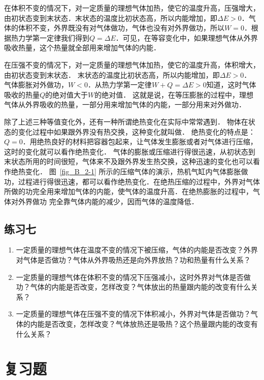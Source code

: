 在体积不变的情况下，对一定质量的理想气体加热，使它的温度升高，压强增大，由初状态变到末状态．末状态的温度比初状态高，所以内能增加，即$\Delta E>0$．气体的体积不变，外界既没有对气体做功，气体也没有对外界做功，所以$W=0$．根据热力学第一定律我们得到$Q=\Delta E$．可见，在等容变化中，如果理想气体从外界吸收热量，这个热量就全部用来增加气体的内能．

在压强不变的情况下，对一定质量的理想气体加热，使它的温度升高，体积增大，由初状态变到末状态．
末状态的温度比初状态高，所以内能增加，即$\Delta E>0$．
气体膨胀对外做功，$W<0$．从热力学第一定律$W+Q=\Delta E>0$知道，这时气体吸收的热量$Q$的绝对值大于$W$的绝对值．
这就是说，在等压膨胀的过程中，理想气体从外界吸收的热量，一部分用来增加气体的内能，一部分用来对外做功．

除了上述三种等值变化外，还有一种所谓绝热变化在实际中常常遇到．
物体在状态的变化过程中如果跟外界没有热交换，这种变化就叫做．
绝热变化的特点是：$Q=0$．用绝热良好的材料把容器包起来，让气体发生膨胀或者对气体进行压缩，这时的变化就可以看作绝热变化．
气体的膨胀或压缩进行得很迅速，从初状态到末状态所用的时间很短，气体来不及跟外界发生热交换，这种迅速的变化也可以看作绝热变化．
图~\ref{fig_B_2-1} 所示的压缩气体的演示，热机气缸内气体膨胀做功，过程进行得很迅速，都可以看作绝热变化．在绝热压缩的过程中，外界对气体所做的功完全用来增加气体的内能，使气体的温度升高．在绝热膨胀的过程中，气体对外界做功
完全靠气体内能的减少，因而气体的温度降低．


\subsection*{练习七}
\begin{enumerate}
    \item 一定质量的理想气体在温度不变的情况下被压缩，气体的内能是否改变？外界对气体是否做功？气体从外界吸热还是向外界放热？功和热量有什么关系？
\item 一定质量的理想气体在体积不变的情况下压强减小，这时外界对气体是否做功？气体的内能是否改变，怎样改变？气体放出的热量跟内能的改变有什么关系？
\item 一定质量的理想气体在压强不变的情况下体积减小，外界对气体是否做功？气体的内能是否改变，怎样改变？气体放热还是吸热？这个热量跟内能的改变有什么关系？
\end{enumerate}



\section*{复习题}

